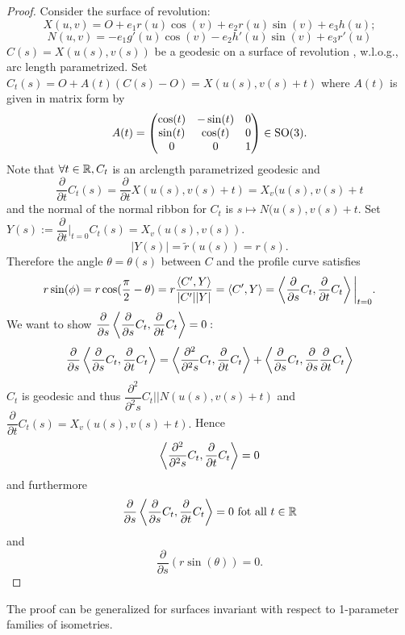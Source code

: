 \begin{proof}Consider the surface of revolution:
		$$ X(u,v) = O +  e_1r(u)\cos(v) + e_2r(u)\sin(v) + e_3h(u); $$
	$$ N(u,v) = -e_1g'(u)\cos(v) - e_2h'(u)\sin(v) +e_3r'(u) $$
	$ C(s) = X(u(s),v(s))$ be a geodesic on a surface of revolution , w.l.o.g., arc length parametrized.
	Set $ C_t(s) = O + A(t)(C(s)-O) = X(u(s),v(s)+t) $ where $ A(t) $ is given in matrix form by
		\[ A(t) = \begin{pmatrix} \cos(t) & -\sin(t) & 0 \\ \sin(t) & \cos(t) & 0 \\ 0 & 0 & 1  \end{pmatrix} \in \mathrm{SO}(3). \]
	Note that $ \forall t \in \mathbb R, C_t$ is an arclength parametrized geodesic and
			\[ \dfrac{\partial}{\partial t} C_t(s) = \dfrac{\partial}{\partial t}X(u(s),v(s)+t) = X_v(u(s),v(s)+t \] and the normal of the normal ribbon for $ C_t $ is $ s \mapsto N(u(s),v(s)+t $.
	Set $ Y(s) := \dfrac{\partial}{\partial t}\big|_{t=0}C_t(s) = X_v(u(s),v(s)). $
	\[|Y(s)| = \widetilde{r}(u(s)) = r(s). \] 
	Therefore the angle $ \theta = \theta(s) $ between $ C $ and the profile curve satisfies
		\[ r\sin(\phi) = r \cos(\dfrac{\pi}{2} - \theta) = r\dfrac{\left \langle C',Y \right\rangle}{|C'||Y|}= \left \langle C',Y \right\rangle = \left \langle \dfrac{\partial}{\partial s}C_t,\dfrac{\partial}{\partial t}C_t \right\rangle\bigg|_{t=0}. \]
	We want to show $ \dfrac{\partial}{\partial s} \left \langle  \dfrac{\partial}{\partial s} C_t , \dfrac{\partial}{\partial t} C_t  \right\rangle = 0: $
		\[ \dfrac{\partial}{\partial s} \left \langle  \dfrac{\partial}{\partial s} C_t , \dfrac{\partial}{\partial t} C_t  \right\rangle = \left \langle  \dfrac{\partial^2}{\partial^2 s} C_t , \dfrac{\partial}{\partial t} C_t \right\rangle + \left \langle  \dfrac{\partial}{\partial s} C_t , \dfrac{\partial}{\partial s} \dfrac{\partial}{\partial t} C_t  \right\rangle \]
	$ C_t $ is geodesic and thus $ \dfrac{\partial^2}{\partial^2s} C_t || N(u(s),v(s)+t) $ and $ \dfrac{\partial}{\partial t} C_t(s)=X_v(u(s),v(s)+t). $ 
	Hence
		\[ \left \langle  \dfrac{\partial^2}{\partial^2 s} C_t , \dfrac{\partial}{\partial t} C_t  \right\rangle = 0 \] 
	and furthermore
		\[ \dfrac{\partial}{\partial s} \left \langle  \dfrac{\partial}{\partial s} C_t , \dfrac{\partial}{\partial t} C_t  \right\rangle = 0 \text{ fot all $t \in \mathbb R$} \] 
	and
		\[ \dfrac{\partial}{\partial s}(r \sin(\theta)) = 0. \]
\end{proof}

\begin{remark}
	
	The proof can be generalized for surfaces invariant with respect to 1-parameter families of isometries.
	
\end{remark}

